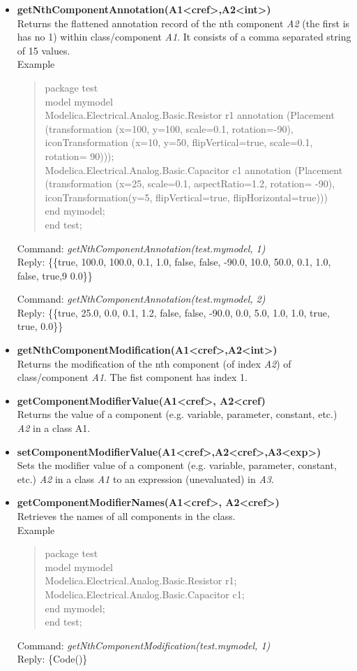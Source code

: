 \documentclass[11pt,a4paper,oneside,english]{book}
\newenvironment{modelicaExamples}{\begin{itemize}}{\end{itemize}}
\newcommand{\api}[2]{\item \textbf{#1} \\ #2}
\newcommand{\tab}{\hspace{2em}}
\newcommand{\command}[1]{Command: \textit{#1}\\}
\newcommand{\reply}[1]{Reply: #1}
\newcommand{\functionex}[2]{\begin{singlespace} \command{#1} \reply{#2} \end{singlespace}}
\newcommand{\examples}{Example}
\newenvironment{mocode}{\begin{verse}\begin{singlespace}\begin{scriptsize}\ttfamily}{\end{scriptsize}\end{singlespace}\end{verse}}
\begin{document}
\begin{modelicaExamples}
		\api{getNthComponentAnnotation(A1<cref>,A2<int>)}{Returns the flattened annotation record of the nth component \textit{A2} (the first is has no 1) within class/component \textit{A1}. It consists of a comma separated string of 15 values.\\
		\examples
		\begin{mocode}
		package test\\
		\tab model mymodel\\
		\tab\tab Modelica.Electrical.Analog.Basic.Resistor r1 annotation (Pla\-ce\-ment (tran\-sfor\-ma\-tion (x=100, y=100, scale=0.1, rotation=-90), i\-con\-Tran\-sfor\-ma\-tion (x=10, y=50, flipVertical=true, scale=0.1, ro\-ta\-tion= 90)));\\
		\tab\tab Modelica.Electrical.Analog.Basic.Capacitor c1 annotation (Pla\-ce\-ment (transformation (x=25,  scale=0.1, aspectRatio=1.2, ro\-ta\-tion= -90), iconTransformation(y=5, flipVertical=true, flipHorizontal=true)))\\
		\tab end mymodel;\\
		end test;
		\end{mocode}
		\functionex{getNthComponentAnnotation(test.mymodel, 1)}
		{\{\{true, 100.0, 100.0, 0.1, 1.0, false, false, -90.0, 10.0, 50.0, 0.1, 1.0, false, true,9 0.0\}\}}

		\functionex{getNthComponentAnnotation(test.mymodel, 2)}
		{\{\{true, 25.0, 0.0, 0.1, 1.2, false, false, -90.0, 0.0, 5.0, 1.0, 1.0, true, true, 0.0\}\}}

		}

			\api{getNthComponentModification(A1<cref>,A2<int>)}{Returns the modification of the nth component (of index \textit{A2}) of class/component \textit{A1}. The fist component has index 1.}

			\api{getComponentModifierValue(A1<cref>, A2<cref)}{Returns the value of a component (e.g. variable, parameter, constant, etc.) \textit{A2} in a class \textup{A1}.}

			\api{setComponentModifierValue(A1<cref>,A2<cref>,A3<exp>)}{Sets the modifier value of a component (e.g. variable, parameter, constant, etc.) \textit{A2} in a class \textit{A1} to an expression (unevaluated) in \textit{A3}.}

			\api{getComponentModifierNames(A1<cref>, A2<cref>)}{Retrieves the names of all components in the class.}\\
			\examples
			\begin{mocode}
			package test\\
			\tab model mymodel\\
			\tab\tab Modelica.Electrical.Analog.Basic.Resistor r1;\\
			\tab\tab Modelica.Electrical.Analog.Basic.Capacitor c1;\\
			\tab end mymodel;\\
			end test;\\
			\end{mocode}
			\functionex{getNthComponentModification(test.mymodel, 1)}
			{\{Code()\}}


\end{modelicaExamples}
\end{document}
